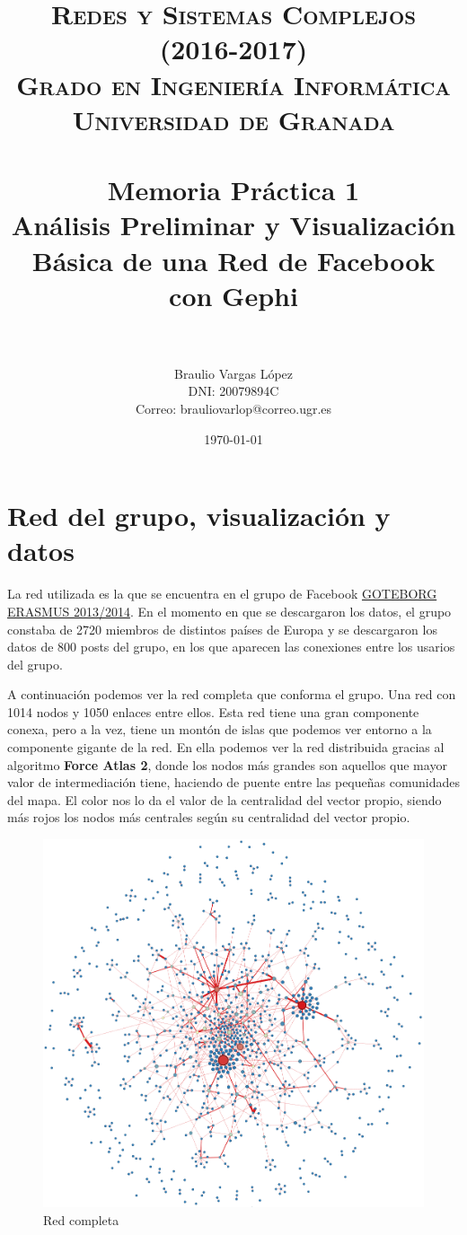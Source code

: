 \documentclass[paper=a4, fontsize=11pt]{article} %
\title{ 
\normalfont \normalsize 
\textsc{{\bf Redes y Sistemas Complejos (2016-2017)} \\ Grado en Ingeniería Informática \\ Universidad de Granada} \\ [25pt] %
\horrule{0.5pt} \\[0.4cm] %
\huge Memoria Práctica 1 \\ Análisis Preliminar y Visualización Básica de una Red de Facebook con Gephi\\%
\horrule{2pt} \\[0.5cm] %
}
\author{Braulio Vargas López\\DNI: 20079894C\\Correo: brauliovarlop@correo.ugr.es} %
\date{\normalsize\today} %
\numberwithin{equation}{section} %
\numberwithin{figure}{section} %
\numberwithin{table}{section} %
\begin{document}
\maketitle %
\newpage %

\tableofcontents %
{}

\section{Red del grupo, visualización y datos}

La red utilizada es la que se encuentra en el grupo de Facebook \href{https://www.facebook.com/groups/goteborgerasmus1314/?fref=ts}{GOTEBORG ERASMUS 2013/2014}. En el momento en que se descargaron los datos, el grupo constaba de 2720 miembros de distintos países de Europa y se descargaron los datos de 800 posts del grupo, en los que aparecen las conexiones entre los usarios del grupo.

A continuación podemos ver la red completa que conforma el grupo. Una red con 1014 nodos y 1050 enlaces entre ellos. Esta red tiene una gran componente conexa, pero a la vez, tiene un montón de islas que podemos ver entorno a la componente gigante de la red. En ella podemos ver la red distribuida gracias al algoritmo \textbf{Force Atlas 2}, donde los nodos más grandes son aquellos que mayor valor de intermediación tiene, haciendo de puente entre las pequeñas comunidades del mapa. El color nos lo da el valor de la centralidad del vector propio, siendo más rojos los nodos más centrales según su centralidad del vector propio.

\begin{figure}[H]
  \centering
  \includegraphics[scale=0.225]{RedCompleta}
  \caption{Red completa}
  \label{red_cmp}
\end{figure}
\end{document}
